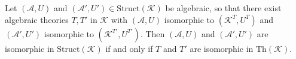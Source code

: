Let $(\mathcal{A}, U)$ and $(\mathcal{A}', U') \in \mathrm{Struct}(\mathcal{K})$ be algebraic, so that there exist algebraic theories $T, T'$ in $\mathcal{K}$ with $(\mathcal{A}, U)$ isomorphic to $(\mathcal{K}^T, U^T)$ and $(\mathcal{A}', U')$ isomorphic to $(\mathcal{K}^{T'}, U^{T'})$. Then $(\mathcal{A}, U)$ and $(\mathcal{A}', U')$ are isomorphic in $\mathrm{Struct}(\mathcal{K})$ if and only if $T$ and $T'$ are isomorphic in $\mathrm{Th}(\mathcal{K})$.
